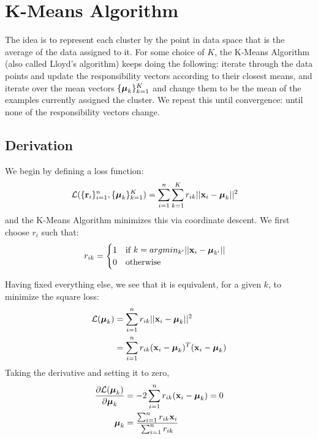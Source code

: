 \documentclass[12pt,letterpaper]{article}
\begin{document}
\section{K-Means Algorithm}
The idea is to represent each cluster by the point in data space that is the average of the data assigned to it. For some choice of $K$, 
the K-Means Algorithm (also called Lloyd's algorithm)
keeps doing the following: iterate through the data points and update the responsibility vectors according to their closest means,
and iterate over the mean vectors $\{\boldsymbol{\mu}_k\}_{k=1}^{K}$ 
and change them to be the mean of the examples currently assigned the cluster. 
%
We repeat this until convergence: until none of the responsibility vectors change.

\subsection{Derivation}
We begin by defining a loss function:
\begin{align*}
	 \mathcal{L}(\{\textbf{r}_i\}_{i=1}^n,\{\boldsymbol{\mu}_k\}_{k=1}^K) &= \sum_{i=1}^{n}\sum_{k=1}^{K} r_{ik} ||\textbf{x}_i - \boldsymbol{\mu}_k ||^2
\end{align*}
and the K-Means Algorithm minimizes this via coordinate descent.
We first choose $r_{i}$ such that:
\begin{align*}
	 r_{ik} &= \begin{cases}
	 	1 & \mbox{if }k = argmin_{k'}||\textbf{x}_i - \boldsymbol{\mu}_{k'}|| \\
	 	0 & \mbox{otherwise}
	 \end{cases}
\end{align*}

Having fixed everything else, we see that it is equivalent, for a given
$k$, to minimize the square loss:
%
\begin{align*}
	 \mathcal{L}(\boldsymbol{\mu}_k) &= \sum_{i=1}^{n} r_{ik} ||\textbf{x}_i -\boldsymbol{\mu}_k||^2 \\
	 &= \sum_{i=1}^{n} r_{ik} (\textbf{x}_i - \boldsymbol{\mu}_k)^T(\textbf{x}_i - \boldsymbol{\mu}_k)
\end{align*}
Taking the derivative and setting it to zero,
\begin{align*}
	 \frac{\partial \mathcal{L}(\boldsymbol{\mu}_k)}{\partial \boldsymbol{\mu}_k} &= -2 \sum_{i = 1}^{n} r_{ik} (\textbf{x}_i - \boldsymbol{\mu}_k) = 0 \\
	 \boldsymbol{\mu}_k &= \frac{\sum_{i=1}^n r_{ik}\textbf{x}_i}{\sum_{i=1}^{n}r_{ik}}
\end{align*}
\end{document}
